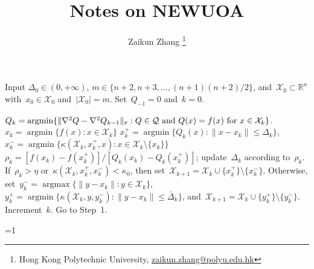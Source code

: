 \documentclass[12pt,a4paper,draft]{article}  %
\title{Notes on NEWUOA}
\date{\DTMnow}
\author{Zaikun Zhang
    \thanks{Hong Kong Polytechnic University, \url{zaikun.zhang@polyu.edu.hk}}
}
\newcommand{\bibfile}{\jobname.bib}  %
\newcommand{\iscite}{0}  %
\theoremstyle{definition}
\numberwithin{equation}{section}
\DeclareMathOperator*{\argmax}{argmax}
\DeclareMathOperator*{\argmin}{argmin}
\newcommand{\RR}{\mathbb{R}}
\newcommand{\Int}{\mathcal{X}}
\newcommand{\Qua}{\mathcal{Q}}
\newcommand{\fro}{{\scriptscriptstyle{\textnormal{F}}}}
\begin{document}
\maketitle




\begin{algorithm}[htbp!]
    \caption{\label{alg:newuoa}}
    Input $\Delta_0\in (0,+\infty)$, $m\in \{n+2, n+3, \dots, (n+1)(n+2)/2\}$,
    and~$\Int_0\subset \RR^n$ with~$x_0\in \Int_0$ and~$|\Int_0|=m$. Set~$Q_{-1} = 0$ and~$k=0$.
    \begin{algorithmic}[1]
        \State %
        $Q_k = \argmin\{\|\nabla^2 Q - \nabla^2Q_{k-1}\|_\fro \mathrel{:}
        Q \in \Qua \text{ and } Q(x) = f(x)~\text{for}~x\in \Int_k\}$.
        \State $x_k = \argmin\{f(x) \mathrel{:} x\in \Int_k\}$
        \State $x_k^+ = \argmin\{Q_k(x)\mathrel{:} \|x-x_k\|\le \Delta_k\}$,
        $x_k^{-}= \argmin\{\kappa(\Int_k, x_k^+, x) \mathrel{:} x \in \Int_{k}\setminus\{x_k\}\}$
        \State $\rho_k = [f(x_k) - f(x_k^+)]/[Q_k(x_k) - Q_k(x_k^+)]$; update~$\Delta_k$ according to~$\rho_k$.
        \State If~$\rho_k > \eta$ or~$\kappa(\Int_k, x_k^+, x_k^{-}) < \kappa_0$, then
        set~$\Int_{k+1} = \Int_k \cup\{x_k^+\}\setminus\{x_k^{-}\}$. Otherwise,
        set~$y_k^{-} = \argmax\{\|y-x_k\| \mathrel{:} y \in \Int_k\}$,
        $y_k^{+} = \argmin\{\kappa(\Int_k, y, y_k^{-}) \mathrel{:} \|y-x_k\|\le \bar{\Delta}_k\}$,
        and~$\Int_{k+1} = \Int_k \cup\{y_k^+\}\setminus\{y_k^{-}\}$. Increment~$k$. Go to Step~1.
    \end{algorithmic}
\end{algorithm}


\ifnum\iscite=1
    \small
    
    
\fi

\end{document}
